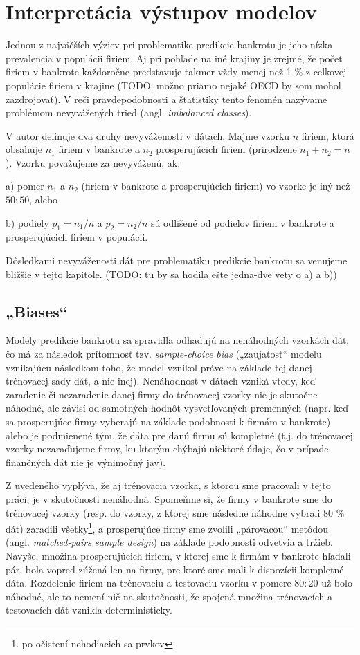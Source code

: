 \section{Interpretácia výstupov modelov}

Jednou z najväčších výziev pri problematike predikcie bankrotu je jeho nízka prevalencia v populácii firiem.
Aj pri pohľade na iné krajiny je zrejmé, že počet firiem v bankrote každoročne predstavuje takmer vždy menej než 1 \% z celkovej populácie
firiem v krajine \cite{gruszczynski} (TODO: možno priamo nejaké OECD by som mohol zazdrojovať).
V reči pravdepodobnosti a štatistiky tento fenomén nazývame problémom nevyvážených tried (angl. \emph{imbalanced classes}).

V \cite{gruszczynski} autor definuje dva druhy nevyváženosti v dátach.
Majme vzorku \(n\) firiem, ktorá obsahuje \(n_1\) firiem v bankrote a \(n_2\) prosperujúcich firiem (prirodzene \(n_1 + n_2 = n\)).
Vzorku považujeme za nevyváženú, ak:

\bigskip
a) pomer \(n_1\) a \(n_2\) (firiem v bankrote a prosperujúcich firiem) vo vzorke je iný než \(50:50\), alebo

b) podiely \(p_1 = n_1/n\) a \(p_2 = n_2/n\) sú odlišené od podielov firiem v bankrote a prosperujúcich firiem v populácii.
\bigskip

Dôsledkami nevyváženosti dát pre problematiku predikcie bankrotu sa venujeme bližšie v tejto kapitole. (TODO: tu by sa hodila ešte jedna-dve vety o a) a b))

\subsection{„Biases“}

Modely predikcie bankrotu sa spravidla odhadujú na nenáhodných vzorkách dát, čo má za následok  prítomnosť tzv. \emph{sample-choice bias}
(„zaujatosť“ modelu vznikajúcu následkom toho, že model vznikol práve na základe tej danej trénovacej sady dát, a nie inej).
Nenáhodnosť v dátach vzniká vtedy, keď zaradenie či nezaradenie danej firmy do trénovacej vzorky nie je skutočne náhodné, ale závisí od samotných hodnôt vysvetľovaných premenných
(napr. keď sa prosperujúce firmy vyberajú na základe podobnosti k firmám v bankrote) alebo je podmienené tým, že dáta pre danú firmu sú kompletné
(t.j. do trénovacej vzorky nezaraďujeme firmy, ku ktorým chýbajú niektoré údaje, čo v prípade finančných dát nie je výnimočný jav).

Z uvedeného vyplýva, že aj trénovacia vzorka, s ktorou sme pracovali v tejto práci, je v skutočnosti nenáhodná.
Spomeňme si, že firmy v bankrote sme do trénovacej vzorky (resp. do vzorky, z ktorej sme následne náhodne vybrali 80 \% dát) zaradili všetky\footnote{po očistení nehodiacich sa prvkov},
a prosperujúce firmy sme zvolili „párovacou“ metódou (angl. \emph{matched-pairs sample design}) na základe podobnosti odvetvia a tržieb.
Navyše, množina prosperujúcich firiem, v ktorej sme k firmám v bankrote hľadali pár, bola vopred zúžená len na firmy, pre ktoré sme mali k dispozícii kompletné dáta.
Rozdelenie firiem na trénovaciu a testovaciu vzorku v pomere \(80:20\) už bolo náhodné, ale to nemení nič na skutočnosti, že spojená množina trénovacích a testovacích dát vznikla deterministicky.

